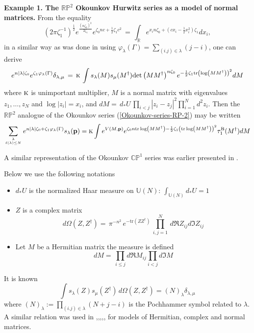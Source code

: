\documentclass[a4paper,10pt]{article}
\newcommand{\bpow}{\mathbf{p}}
\theoremstyle{plain}
\theoremstyle{remark}
\def\tr{\mathrm {tr}}
\def\det{\mathrm {det}}
\def\be{\begin{equation}}
\def\ee{\end{equation}}
\def\tr{\mathrm {tr}}
\def\det{\mathrm {det}}
\begin{document}
{\bf Example 1. The $\mathbb{RP}^2$ Okounkov Hurwitz series as a model of normal matrices.}
From the equality
\[
\left({2\pi}{\zeta_1^{-1}} \right)^{\frac 12} e^{\frac{(n\zeta_0)^2}{2\zeta_1}} e^{\zeta_0 nc+ \frac12 \zeta_1 c^2}\,
=\,
 \int_{\mathbb{R}} e^{x_i n\zeta_0 +(cx_i- \frac12 x^2_i)\zeta_1} dx_i ,
\]
 in a similar way as was done in \cite{OShiota-2004} using $\varphi_\lambda(\Gamma)=\sum_{(i.j)\in\lambda}(j-i)$,
 one can derive
\[
 e^{n|\lambda|\zeta_0}e^{\zeta_1 \varphi_\lambda(\Gamma)}\delta_{\lambda,\mu}\,=\,\textsc{k} \,
 \int  s_\lambda(M) s_\mu(M^\dag) \det \left(MM^\dag\right)^{n\zeta_0}
 e^{-\frac12 \zeta_1\tr \left( \log \left( MM^\dag\right)\right)^2} dM
\]
where $\textsc{k}$ is unimportant multiplier,  $M$ is a normal matrix with eigenvalues $z_1,\dots,z_N$ and $\log |z_i|=x_i$,
and
$dM=\,d_*U\,\prod_{i<j}|z_i-z_j|^2\prod_{i=1}^N d^2 z_i$. Then the $\mathbb{RP}^2$ analogue of the Okounkov series
(\ref{Okounkov-series-RP-2}) may be written
\be\label{Okounkov-tau-normal-matrices-BKP}
\sum_{\lambda\atop \ell(\lambda)\le N}e^{n|\lambda|\zeta_0 +
\zeta_1 \varphi_\lambda(\Gamma)}
s_\lambda(\bpow)=\textsc{k}
 \int  e^{V(M,\bpow)}
 e^{\zeta_0 n\tr \log \left(MM^\dag\right)-\frac12 \zeta_1\left( \tr\log \left( MM^\dag\right)\right)^2}
 \tau^{\rm B}_1(M^\dag) dM
\ee

A similar representation of the Okounkov $\mathbb{CP}^1$ series  was earlier presented in
\cite{AlexandrovZabrodin-Okounkov}.


Below we use the following notations
 \begin{itemize}
  \item $  d_*U $ is the normalized Haar measure on $\mathbb{\mathbb{U}}(N)$: $\int_{\mathbb{U}(N)}d_*U =1$

  \item $Z$ is a complex matrix
    $$
d\Omega(Z,Z^\dag)  =\,\pi^{-n^2}\,e^{-\tr \left(ZZ^\dag\right)}\,
\prod_{i,j=1}^N \,d \Re Z_{ij}d \Im Z_{ij}
  $$


  \item Let $M$ be a Hermitian matrix the measure is defined
   $$
   dM= \, \prod_{i\le j}
d\Re M_{ij} \prod_{i<j} d\Im M
  $$

 \end{itemize}




It is known \cite{Mac}
\be\label{s-s-N_lambda-1}
\int s_\lambda(Z)s_\mu(Z^\dag)\,d\Omega(Z,Z^\dag) = (N)_\lambda\delta_{\lambda,\mu}
\ee
where $(N)_\lambda:=\prod_{(i.j)\in\lambda}(N+j-i)$ is the Pochhammer symbol
related to $\lambda$. A similar relation
was used in \cite{O-Acta},\cite{HO-2MM},\cite{O-2002},\cite{AMMN-2014},\cite{OShiota-2004}, for models of Hermitian, complex
and normal matrices.
\end{document}
